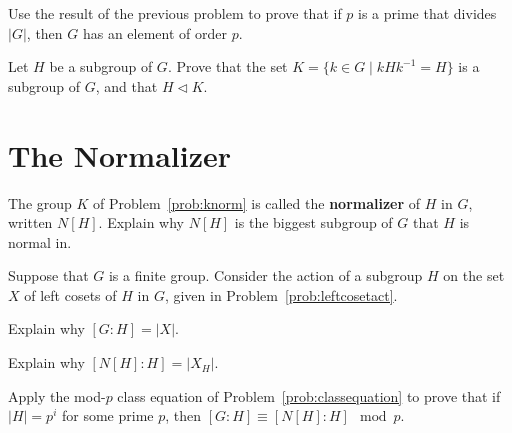 \begin{problem}\label{prob:cauchy}
Use the result of the previous problem to prove that if $p$ is a prime that divides $\lvert G \rvert$, then $G$ has an element of order $p$.
\begin{annotation}
\end{annotation}
\end{problem}

\begin{problem}\label{prob:knorm}
Let $H$ be a subgroup of $G$.  Prove that the set $K = \{ k \in G \mid kHk^{-1} = H\}$ is a subgroup of $G$, and that $H \lhd K$.
\end{problem}

\section{The Normalizer}

\begin{problem}\label{prob:biggestnorm}
The group $K$ of Problem~\ref{prob:knorm} is called the \textbf{normalizer} of $H$ in $G$, written $N[H]$.  Explain why $N[H]$ is the biggest subgroup of $G$ that $H$ is normal in.
\begin{annotation}
\end{annotation}
\end{problem}

\begin{problem}
Suppose that $G$ is a finite group. Consider the action of a subgroup $H$ on the set $X$ of left cosets of $H$ in $G$, given in Problem~\ref{prob:leftcosetact}.
\begin{problemparts}
 \item Explain why $[G:H] = \lvert X \rvert$.
 \item Explain why $[N[H]:H] = \lvert X_H \rvert$.
\end{problemparts}
\end{problem}

\begin{problem}\label{prob:pgroupnorm}
Apply the mod-$p$ class equation of Problem~\ref{prob:classequation} to prove that if $\lvert H \rvert = p^i$ for some prime $p$, then $[G:H] \equiv [N[H]:H] \mod p$.
\begin{annotation}
\end{annotation}
\end{problem}

